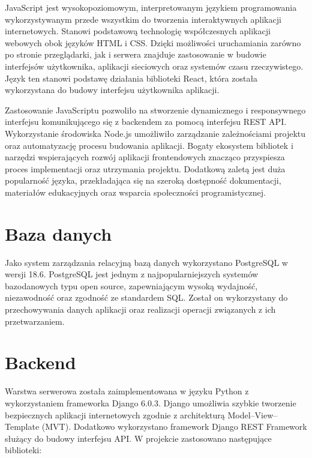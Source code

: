 \documentclass[12pt]{book}
\begin{document}
	JavaScript jest wysokopoziomowym, interpretowanym językiem programowania wykorzystywanym przede wszystkim do tworzenia interaktywnych aplikacji internetowych.
Stanowi podstawową technologię współczesnych aplikacji webowych obok języków HTML i CSS. Dzięki możliwości uruchamiania zarówno po stronie przeglądarki,
jak i serwera znajduje zastosowanie w budowie interfejsów użytkownika, aplikacji sieciowych oraz systemów czasu rzeczywistego.
Język ten stanowi podstawę działania biblioteki React, która została wykorzystana do budowy interfejsu użytkownika aplikacji.

	Zastosowanie JavaScriptu pozwoliło na stworzenie dynamicznego i responsywnego interfejsu komunikującego się z backendem za pomocą interfejsu REST API.
Wykorzystanie środowiska Node.js umożliwiło zarządzanie zależnościami projektu oraz automatyzację procesu budowania aplikacji.
Bogaty ekosystem bibliotek i narzędzi wspierających rozwój aplikacji frontendowych znacząco przyspiesza proces implementacji oraz utrzymania projektu.
Dodatkową zaletą jest duża popularność języka, przekładająca się na szeroką dostępność dokumentacji, materiałów edukacyjnych oraz wsparcia społeczności programistycznej.

\section{Baza danych}

Jako system zarządzania relacyjną bazą danych wykorzystano PostgreSQL w wersji 18.6.
PostgreSQL jest jednym z najpopularniejszych systemów bazodanowych typu open source, zapewniającym wysoką wydajność,
niezawodność oraz zgodność ze standardem SQL. Został on wykorzystany do przechowywania danych aplikacji oraz realizacji
operacji związanych z ich przetwarzaniem.

\section{Backend}

Warstwa serwerowa została zaimplementowana w języku Python z wykorzystaniem frameworka Django 6.0.3. 
Django umożliwia szybkie tworzenie bezpiecznych aplikacji internetowych zgodnie z architekturą Model--View--Template (MVT). 
Dodatkowo wykorzystano framework Django REST Framework służący do budowy interfejsu API.
W projekcie zastosowano następujące biblioteki:
\end{document}
